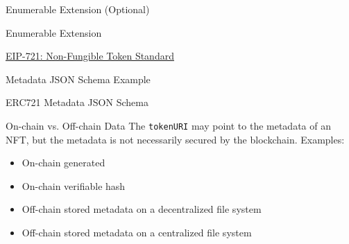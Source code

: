 \documentclass[handout]{beamer}
\begin{document}
\begin{frame}{Enumerable Extension (Optional)}
	\begin{samplecode}{Enumerable Extension}
		
	\end{samplecode}
	\center
	\vspace{-0.5em}
	\link \href{https://eips.ethereum.org/EIPS/eip-721}{EIP-721: Non-Fungible Token Standard}
\end{frame}


\begin{frame}{Metadata JSON Schema Example}
	\begin{samplecode}{ERC721 Metadata JSON Schema}
		
	\end{samplecode}
\end{frame}

\begin{frame}{On-chain vs. Off-chain Data}
	The \texttt{tokenURI} may point to the metadata of an NFT, but the metadata is not necessarily secured by the blockchain. Examples:\\

	\begin{itemize}
		\item<2-> On-chain generated %
		\item<3-> On-chain verifiable hash %
		\item<4-> Off-chain stored metadata on a decentralized file system %
		\item<5-> Off-chain stored metadata on a centralized file system %
	\end{itemize}
\end{frame}
\end{document}
